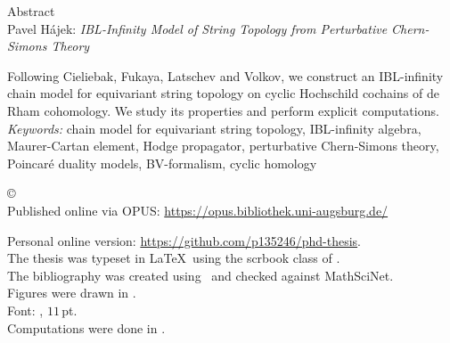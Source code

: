 \documentclass[\MainFolder/Text.tex]{subfiles}
\begin{document}
\begin{center}
  {\LARGE Abstract}\\[0.5cm]
  Pavel H\'ajek: {\itshape IBL-Infinity Model of String Topology from Perturbative Chern-Simons Theory}
\end{center}

Following Cieliebak, Fukaya, Latschev and Volkov, we construct an IBL-infinity chain model for equivariant string topology on cyclic Hochschild cochains of de Rham cohomology. We study its properties and perform explicit computations.\vspace{.8cm}\\
\noindent \emph{Keywords:} chain model for equivariant string topology, IBL-infinity algebra, Maurer-Cartan element, Hodge propagator, perturbative Chern-Simons theory, Poincar\'e duality models, BV-formalism, cyclic homology
\clearpage 
{\null\vfill
\begin{flushleft}
\makeatletter
\copyright\ \the\year\ \@author
\makeatother \\[\baselineskip]

Published online via OPUS:  \url{https://opus.bibliothek.uni-augsburg.de/}

Personal online version: \url{https://github.com/p135246/phd-thesis}.\\[\baselineskip]

The thesis was typeset in \LaTeX\ using the \textsf{scrbook} class of \Komaname. \\
The bibliography was created using \Biblatexname\ and checked against \textsf{MathSciNet}. \\
Figures were drawn in \Tikzname.\\
Font: \Libertinename, $11$\,pt.\\
Computations were done in \Mathematicaname.\\[\baselineskip]
\end{flushleft}
}
\end{document}
